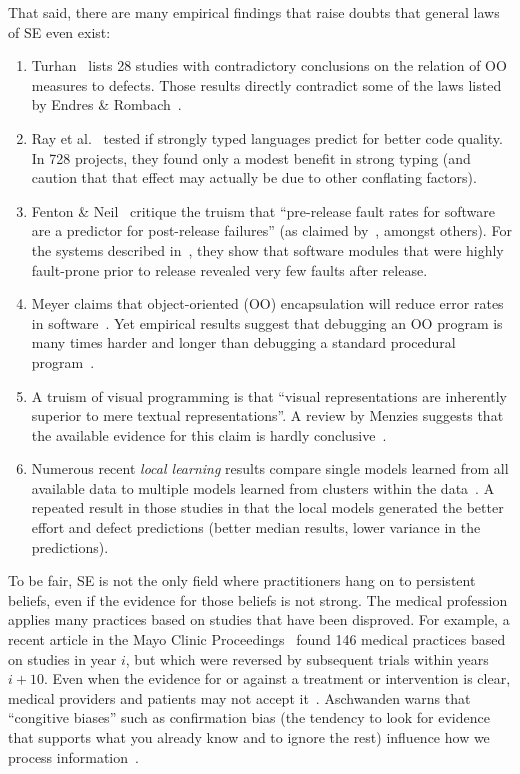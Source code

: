 \documentclass{sig-alternate}
\newcommand{\be}{\begin{enumerate}}
\newcommand{\ee}{\end{enumerate}}
\begin{document}
That said, there are many empirical  findings that 
raise doubts that   general laws of SE even exist:
\be
\item
Turhan~\cite{me12d} lists 28 studies with contradictory conclusions
on the relation of OO measures to defects.  Those results
 directly  contradict some of the laws listed by 
Endres \& Rombach~\cite{endres03}.
\item
Ray et al.~\cite{ray2014lang} tested if   strongly typed languages
predict for better code quality. In  728 projects,
they found  only a modest benefit in strong typing
(and caution that that effect may actually be due to other  conflating factors).
\item
Fenton \& Neil~\cite{fenton00,fenton00b}   critique the truism that
``pre-release fault rates for software
are a predictor for post-release failures'' (as claimed by~\cite{dunsmore88},
amongst others). For the systems described in~\cite{fenton97}, they
show that software modules that were highly fault-prone
prior to release revealed very few faults after release.
\item
Meyer claims that   object-oriented (OO) encapsulation will
reduce error rates in software~\cite{Meyer1988}.  Yet empirical results suggest
that debugging an OO program is many times harder and
longer than debugging a standard procedural program~\cite{hatton98}.
\item
A truism of visual programming is that ``visual
representations are inherently superior to mere textual representations''. A review by Menzies suggests that the available
evidence for this claim is hardly conclusive~\cite{me00v}. 
\item
Numerous recent {\em local learning} results compare single models
learned from all available data to multiple models learned from clusters within the data~\cite{betten14,yang11,yang13,minku13,me12d,me11m,betta12,posnett11}.
A repeated result in those studies in that the local models generated the better effort
and defect predictions (better median results,
lower variance in the predictions).
\ee
To be fair, 
SE is  not the only
field where practitioners hang on to persistent beliefs, even if the evidence
for those beliefs is not strong.
The medical profession applies  many practices based on studies
that have been disproved. For example,
a  recent article
in the Mayo Clinic Proceedings~\cite{prasad13} found  
146 medical practices based on studies 
in year $i$, but which were  reversed by subsequent trials within years $i+10$.
Even when the evidence for or against a treatment or intervention is clear, medical providers and patients may not accept it~\cite{aschwanden10}.
Aschwanden warns that ``congitive biases''  such as  confirmation bias (the tendency to look for evidence that supports what you already know and to ignore the rest)  influence how we process information~\cite{aschwanden15}.
\end{document}
